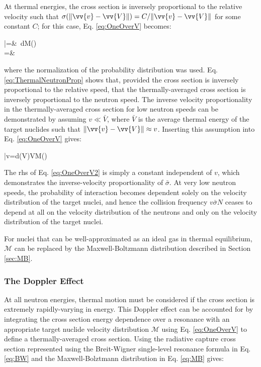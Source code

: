 At thermal energies, the cross section is inversely proportional to the relative velocity such that \(\sigma(\|\vv{v}-\vv{V}\|)=C/\|\vv{v}-\vv{V}\|\) for some constant \(C\); for this case, Eq. \eqref{eq:OneOverV} becomes:

\beqa
\label{eq:ThermalNeutronProp}
\bar{\sigma}=&\ \int dM()\\
=&\ 
\eeqa

where the normalization of the probability distribution was used. Eq. \eqref{eq:ThermalNeutronProp} shows that, provided the cross section is inversely proportional to the relative speed, that the thermally-averaged cross section is inversely proportional to the neutron speed. The inverse velocity proportionality in the thermally-averaged cross section for low neutron speeds can be demonstrated by assuming \(v\ll \bar{V}\), where \(\bar{V}\) is the average thermal energy of the target nuclides such that \(\|\vv{v}-\vv{V}\|\approx v\). Inserting this assumption into Eq. \eqref{eq:OneOverV} gives:

\beq
\label{eq:OneOverV2}
\bar{\sigma}v=\int d\sigma(V)VM()
\eeq

The \gls{rhs} of Eq. \eqref{eq:OneOverV2} is simply a constant independent of \(v\), which demonstrates the inverse-velocity proportionality of \(\bar{\sigma}\). At very low neutron speeds, the probability of interaction becomes dependent solely on the velocity distribution of the target nuclei, and hence the collision frequency \(v\bar{\sigma}N\) ceases to depend at all on the velocity distribution of the neutrons and only on the velocity distribution of the target nuclei. 

For nuclei that can be well-approximated as an ideal gas in thermal equilibrium, \(\mathscr{M}\) can be replaced by the Maxwell-Boltzmann distribution described in Section \ref{sec:MB}.

\subsubsection{The Doppler Effect}

At all neutron energies, thermal motion must be considered if the cross section is extremely rapidly-varying in energy. This Doppler effect can be accounted for by integrating the cross section energy dependence over a resonance with an appropriate target nuclide velocity distribution \(\mathscr{M}\) using Eq. \eqref{eq:OneOverV} to define a thermally-averaged cross section. Using the radiative capture cross section represented using the Breit-Wigner single-level resonance formula in Eq. \eqref{eq:BW} and the Maxwell-Bolztmann distribution in Eq. \eqref{eq:MB} gives:

